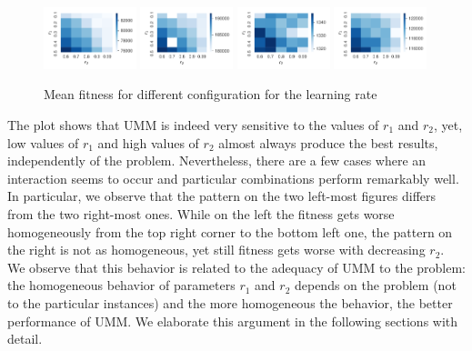 \documentclass[runningheads]{llncs}
\begin{document}
\begin{figure}[htb]
  \centering%
  \includegraphics[width=0.24\textwidth]{../img/heatmap_N-t1d100_01}
  \includegraphics[width=0.24\textwidth]{../img/heatmap_N-t1d150_01}
  \includegraphics[width=0.24\textwidth]{../img/heatmap_rec05}
  \includegraphics[width=0.24\textwidth]{../img/heatmap_kra32_dat}
    \caption{Mean fitness  for different configuration for the learning rate \label{fig:heatmaps}}
\end{figure}

The plot shows that UMM is indeed very sensitive to the values of $r_1$ and
$r_2$, yet, low values of $r_1$ and high values of $r_2$ almost always produce
the best results, independently of the problem. Nevertheless, there are a few
cases where an interaction seems to occur and particular combinations perform
remarkably well.  In particular, we observe that the pattern on
the two left-most figures differs from the two right-most ones. While on the
left the fitness gets worse homogeneously from the top right corner to the
bottom left one, the pattern on the right is not as homogeneous, yet still
fitness gets worse with decreasing $r_2$.  We observe that this behavior is
related to the adequacy of UMM to the problem: the homogeneous behavior of
parameters $r_1$ and $r_2$ depends on the problem (not to the particular
instances) and the more homogeneous the behavior, the better performance of
UMM. We elaborate this argument in the following sections with detail.
\end{document}
